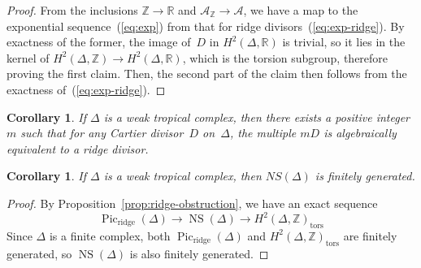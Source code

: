 \documentclass[11pt]{amsart}
\newtheorem{cor}[thm]{Corollary}
\theoremstyle{definition}
\newcommand{\cA}{\mathcal A}
\newcommand{\NS}{\operatorname{NS}}
\newcommand{\Pic}{\operatorname{Pic}}
\newcommand{\ridge}{\operatorname{ridge}}
\newcommand{\RR}{\mathbb R}
\newcommand{\tors}{\mathrm{tors}}
\newcommand{\ZZ}{\mathbb Z}
\begin{document}
\begin{proof}
From the inclusions $\ZZ \rightarrow \RR$ and $\cA_{\ZZ} \rightarrow \cA$, we
have a map to the exponential sequence~(\ref{eq:exp}) from that for ridge
divisors~(\ref{eq:exp-ridge}). By exactness of the former, the image of~$D$ in
$H^2(\Delta, \RR)$ is trivial, so it lies in the kernel of $H^2(\Delta, \ZZ)
\rightarrow H^2(\Delta, \RR)$, which is the torsion subgroup, therefore proving
the first claim. Then, the second part of the claim then follows from the
exactness of~(\ref{eq:exp-ridge}).
\end{proof}

\begin{cor}\label{cor:multiple-ridge}
If $\Delta$ is a weak tropical complex, then there exists a positive integer $m$
such that for any Cartier divisor~$D$ on~$\Delta$, the multiple $mD$ is
algebraically equivalent to a ridge divisor.
\end{cor}

\begin{cor}\label{cor:finitely-generated}
If $\Delta$ is a weak tropical complex, then $NS(\Delta)$ is finitely generated.
\end{cor}

\begin{proof}
By Proposition~\ref{prop:ridge-obstruction}, we have an exact sequence
\begin{equation*}
\Pic_{\ridge}(\Delta) \rightarrow \NS(\Delta) \rightarrow
H^2(\Delta, \ZZ)_{\tors}
\end{equation*}
Since $\Delta$ is a finite complex, both $\Pic_{\ridge}(\Delta)$ and
$H^2(\Delta, \ZZ)_{\tors}$ are finitely generated, so $\NS(\Delta)$ is also
finitely generated.
\end{proof}
\end{document}
